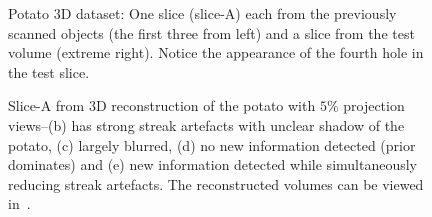 \documentclass[journal]{IEEEtran}
\begin{document}
\begin{figure}[!h]
\begin{subfigure}[b]{0.235\linewidth}
\captionsetup{labelformat=empty}
        \caption{}
     \end{subfigure}
      \caption{Potato 3D dataset: One slice (slice-A) each from the previously scanned objects (the first three from left) and a slice from the test 
        volume (extreme right). Notice the appearance of the fourth
        hole in the test slice. }
\label{fig:object-prior_test_potato_A}
\end{figure}

\begin{figure}[!h]
\centering
{}\hfill
{}\hfill
{}\hfill
{}\hfill
{}
\caption{Slice-A from 3D reconstruction of the potato with $5\%$ projection views--(b) has strong streak artefacts with unclear shadow of the potato, (c) largely blurred, (d) no new information detected (prior dominates) and (e) new information detected while simultaneously reducing streak artefacts. The reconstructed volumes can be viewed in~\cite{supp_paper}.}
\label{fig:potato_3D_results_A}
\end{figure}
\end{document}
